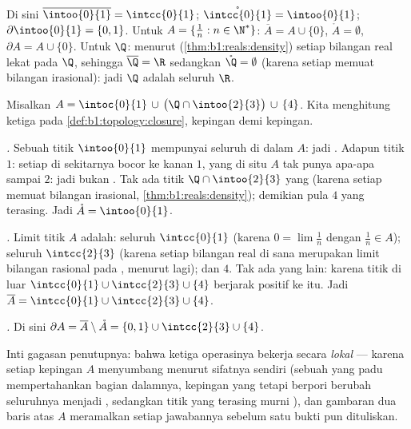 \begin{example}\label{ex:b1:topology:closureexamples}
Di sini $\overline{\intoo{0}{1}} = \intcc{0}{1}$;
$\mathring{\intcc{0}{1}} = \intoo{0}{1}$; $\partial\intoo{0}{1} =
\{0, 1\}$. Untuk $A = \{\frac 1n : n \in \N^*\}$: $\overline A = A
\cup \{0\}$, $\mathring A = \emptyset$, $\partial A = A \cup \{0\}$.
Untuk $\Q$: menurut  (\cref{thm:b1:reals:density}) setiap bilangan real
lekat pada $\Q$, sehingga $\overline{\Q} = \R$ sedangkan $\mathring{\Q} =
\emptyset$ (karena setiap  memuat bilangan irasional): jadi 
$\Q$ adalah seluruh $\R$.
\end{example}

\begin{example}\label{ex:b1:topology:anatomy}
Misalkan $A = \intoc{0}{1} \,\cup\, \bigl(\Q \cap \intoo{2}{3}\bigr)
\,\cup\, \{4\}$. Kita menghitung ketiga  pada
\cref{def:b1:topology:closure}, kepingan demi kepingan.

\emph{.} Sebuah titik $\intoo{0}{1}$ mempunyai seluruh 
di dalam $A$: jadi . Adapun titik $1$: setiap  di sekitarnya
bocor ke kanan $1$, yang di situ $A$ tak punya apa-apa sampai $2$: jadi bukan
. Tak ada titik $\Q \cap \intoo{2}{3}$ yang  (karena setiap
 memuat bilangan irasional, \cref{thm:b1:reals:density});
demikian pula $4$ yang terasing. Jadi $\mathring A = \intoo{0}{1}$.

\emph{.} Limit titik $A$ adalah: seluruh $\intcc{0}{1}$
(karena $0 = \lim \frac1n$ dengan $\frac 1n \in A$); seluruh
$\intcc{2}{3}$ (karena setiap bilangan real di sana merupakan limit bilangan rasional pada
, menurut  lagi); dan $4$. Tak ada yang lain: karena titik
di luar $\intcc{0}{1} \cup \intcc{2}{3} \cup \{4\}$ berjarak positif
ke  itu. Jadi $\overline A = \intcc{0}{1} \cup
\intcc{2}{3} \cup \{4\}$.

\emph{.} Di sini $\partial A = \overline A \setminus \mathring A
= \{0, 1\} \cup \intcc{2}{3} \cup \{4\}$.

Inti gagasan penutupnya: bahwa ketiga operasinya bekerja secara \emph{lokal} ---
karena setiap kepingan $A$ menyumbang menurut sifatnya sendiri (sebuah
 yang padu mempertahankan bagian dalamnya, kepingan yang  tetapi berpori berubah
seluruhnya menjadi , sedangkan titik yang terasing murni ), dan
gambaran dua baris atas $A$ meramalkan setiap jawabannya sebelum satu bukti pun
dituliskan.
\end{example}

